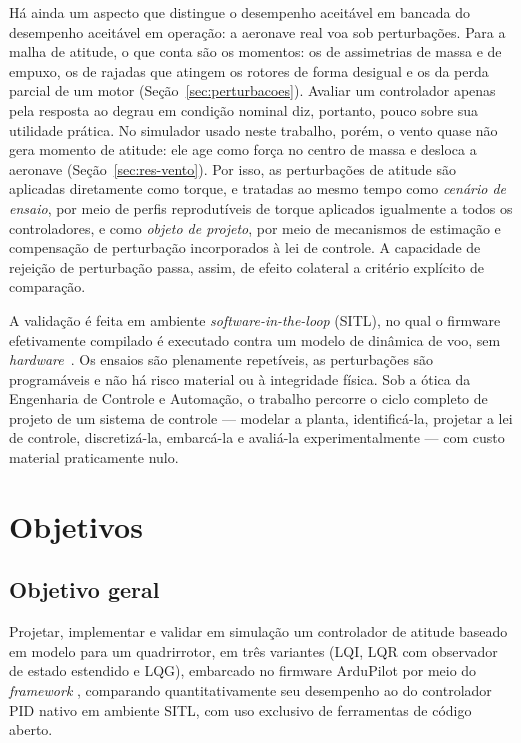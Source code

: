 Há ainda um aspecto que distingue o desempenho aceitável em bancada do
desempenho aceitável em operação: a aeronave real voa sob perturbações. Para a
malha de atitude, o que conta são os momentos: os de assimetrias de massa e
de empuxo, os de rajadas que atingem os rotores de forma desigual e os da
perda parcial de um motor (Seção~\ref{sec:perturbacoes}). Avaliar um
controlador apenas pela resposta ao degrau em condição nominal diz, portanto,
pouco sobre sua utilidade prática. No simulador usado neste trabalho, porém,
o vento quase não gera momento de atitude: ele age como força no centro de
massa e desloca a aeronave (Seção~\ref{sec:res-vento}). Por isso, as
perturbações de atitude são aplicadas diretamente como torque, e tratadas ao
mesmo tempo como \emph{cenário de ensaio}, por meio de perfis reprodutíveis
de torque aplicados igualmente a todos os controladores, e como \emph{objeto
de projeto}, por meio de mecanismos de estimação e compensação de perturbação
incorporados à lei de controle. A capacidade de rejeição de perturbação passa,
assim, de efeito colateral a critério explícito de comparação.

A validação é feita em ambiente \textit{software-in-the-loop} (SITL), no qual
o firmware efetivamente compilado é executado contra um modelo de dinâmica de
voo, sem \textit{hardware}~\cite{ardupilotdev}. Os ensaios são plenamente
repetíveis, as perturbações são programáveis e não há risco material ou à
integridade física. Sob a ótica da Engenharia de Controle e Automação, o
trabalho percorre o ciclo completo de projeto de um sistema de controle ---
modelar a planta, identificá-la, projetar a lei de controle, discretizá-la,
embarcá-la e avaliá-la experimentalmente --- com custo material praticamente
nulo.

\section{Objetivos}
\label{sec:objetivos}

\subsection{Objetivo geral}

Projetar, implementar e validar em simulação um controlador de atitude
baseado em modelo para um quadrirrotor, em três variantes (LQI, LQR com
observador de estado estendido e LQG), embarcado no firmware ArduPilot por
meio do
\textit{framework} , comparando quantitativamente
seu desempenho ao do controlador PID nativo em ambiente SITL, com uso
exclusivo de ferramentas de código aberto.

